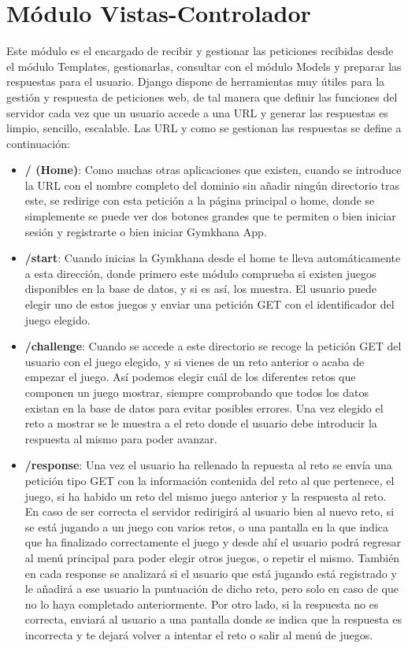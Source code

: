\documentclass[a4paper, 12pt]{book}
\begin{document}
\section{Módulo Vistas-Controlador}
Este módulo es el encargado de recibir y gestionar las peticiones recibidas desde el módulo Templates, gestionarlas, consultar con el módulo Models y preparar las respuestas para el usuario. Django dispone de herramientas muy útiles para la gestión y respuesta de peticiones web, de tal manera que definir las funciones del servidor cada vez que un usuario accede a una URL y generar las respuestas es limpio, sencillo, escalable. 
Las URL y como se gestionan las respuestas se define a continuación: 

\begin{itemize}
	\item \textbf {/ (Home)}: Como muchas otras aplicaciones que existen, cuando se introduce la URL con el nombre completo del dominio sin añadir ningún directorio tras este, se redirige con esta petición a la página principal o home, donde se simplemente se puede ver dos botones grandes que te permiten o bien iniciar sesión y registrarte o bien iniciar Gymkhana App. 
	\item \textbf {/start}: Cuando inicias la Gymkhana desde el home te lleva automáticamente a esta dirección, donde primero este módulo comprueba si existen juegos disponibles en la base de datos, y si es así, los muestra. El usuario puede elegir uno de estos juegos y enviar una petición GET con el identificador del juego elegido. 
	\item \textbf {/challenge}: Cuando se accede a este directorio se recoge la petición GET del usuario con el juego elegido, y si vienes de un reto anterior o acaba de empezar el juego. Así podemos elegir cuál de los diferentes retos que componen un juego mostrar, siempre comprobando que todos los datos existan en la base de datos para evitar posibles errores. Una vez elegido el reto a mostrar se le muestra a el reto donde el usuario debe introducir la respuesta al mismo para poder avanzar. 
	\item \textbf {/response}: Una vez el usuario ha rellenado la repuesta al reto se envía una petición tipo GET con la información contenida del reto al que pertenece, el juego, si ha habido un reto del mismo juego anterior y la respuesta al reto. En caso de ser correcta el servidor redirigirá al usuario bien al nuevo reto, si se está jugando a un juego con varios retos, o una pantalla en la que indica que ha finalizado correctamente el juego y desde ahí el usuario podrá regresar al menú principal para poder elegir otros juegos, o repetir el mismo. También en cada response se analizará si el usuario que está jugando está registrado y le añadirá a ese usuario la puntuación de dicho reto, pero solo en caso de que no lo haya completado anteriormente. Por otro lado, si la respuesta no es correcta, enviará al usuario a una pantalla donde se indica que la respuesta es incorrecta y te dejará volver a intentar el reto o salir al menú de juegos.

\end{itemize}
\end{document}

